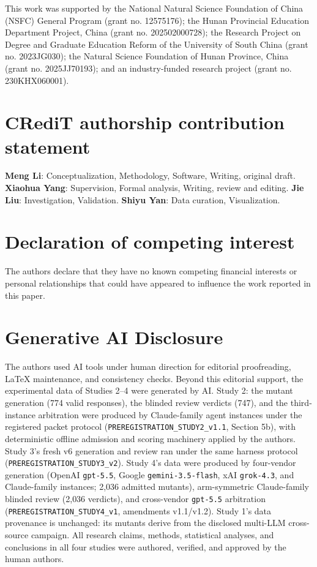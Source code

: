 \documentclass[manuscript,screen,review]{acmart}
\begin{document}
This work was supported by the National Natural Science Foundation of China
(NSFC) General Program (grant no. 12575176); the Hunan Provincial Education
Department Project, China (grant no. 202502000728); the Research Project on
Degree and Graduate Education Reform of the University of South China (grant
no. 2023JG030); the Natural Science Foundation of Hunan Province, China (grant
no. 2025JJ70193); and an industry-funded research project (grant no.
230KHX060001).

\section*{CRediT authorship contribution statement}

\textbf{Meng Li}: Conceptualization, Methodology, Software, Writing, original
draft. \textbf{Xiaohua Yang}: Supervision, Formal analysis, Writing, review
and editing. \textbf{Jie Liu}: Investigation, Validation. \textbf{Shiyu Yan}:
Data curation, Visualization.

\section*{Declaration of competing interest}

The authors declare that they have no known competing financial interests or
personal relationships that could have appeared to influence the work reported
in this paper.

\section*{Generative AI Disclosure}

The authors used AI tools under human direction for editorial proofreading,
LaTeX maintenance, and consistency checks. Beyond this editorial support,
the experimental data of Studies 2--4 were generated by AI. Study 2: the
mutant generation (774 valid responses), the blinded review verdicts (747),
and the third-instance arbitration were produced by Claude-family agent
instances under the registered packet protocol
(\texttt{PREREGISTRATION\_STUDY2\_v1.1}, Section 5b), with deterministic
offline admission and scoring machinery applied by the authors. Study 3's
fresh v6 generation and review ran under the same harness protocol
(\texttt{PREREGISTRATION\_STUDY3\_v2}). Study 4's data were produced by
four-vendor generation (OpenAI \texttt{gpt-5.5}, Google
\texttt{gemini-3.5-flash}, xAI \texttt{grok-4.3}, and Claude-family
instances; 2{,}036 admitted mutants), arm-symmetric Claude-family blinded
review (2{,}036 verdicts), and cross-vendor \texttt{gpt-5.5} arbitration
(\texttt{PREREGISTRATION\_STUDY4\_v1}, amendments v1.1/v1.2). Study 1's
data provenance is unchanged: its mutants derive from the disclosed
multi-LLM cross-source campaign. All research claims, methods, statistical
analyses, and conclusions in all four studies were authored, verified, and
approved by the human authors.



\end{document}

